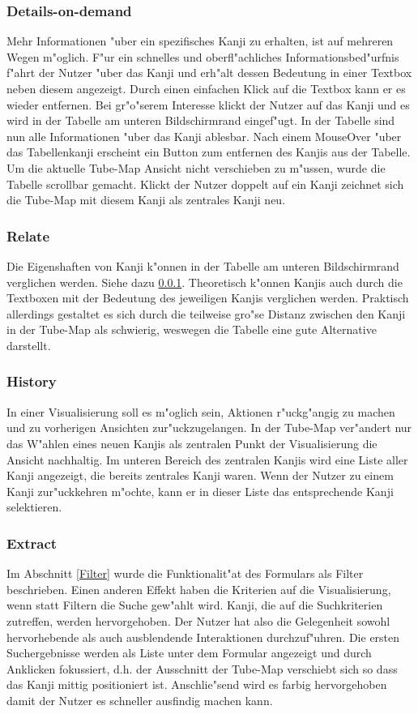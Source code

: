 \subsubsection{Details-on-demand}\label{Details-on-demand}
Mehr Informationen "uber ein spezifisches Kanji zu erhalten, ist auf mehreren Wegen m"oglich. F"ur ein schnelles und oberfl"achliches Informationsbed"urfnis f"ahrt der Nutzer "uber das Kanji und erh"alt dessen Bedeutung in einer Textbox neben diesem angezeigt. Durch einen einfachen Klick auf die Textbox kann er es wieder entfernen. Bei gr"o"serem Interesse klickt der Nutzer auf das Kanji und es wird in der Tabelle am unteren Bildschirmrand eingef"ugt. In der Tabelle sind nun alle Informationen "uber das Kanji ablesbar. Nach einem MouseOver "uber das Tabellenkanji erscheint ein Button zum entfernen des Kanjis aus der Tabelle. Um die aktuelle Tube-Map Ansicht nicht verschieben zu m"ussen, wurde die Tabelle scrollbar gemacht. Klickt der Nutzer doppelt auf ein Kanji zeichnet sich die Tube-Map mit diesem Kanji als zentrales Kanji neu. 

\subsubsection{Relate}
Die Eigenshaften von Kanji k"onnen in der Tabelle am unteren Bildschirmrand verglichen werden. Siehe dazu \ref{Details-on-demand}. Theoretisch k"onnen Kanjis auch durch die Textboxen mit der Bedeutung des jeweiligen Kanjis verglichen werden. Praktisch allerdings gestaltet es sich durch die teilweise gro"se Distanz zwischen den Kanji in der Tube-Map als schwierig, weswegen die Tabelle eine gute Alternative darstellt. 

\subsubsection{History}
In einer Visualisierung soll es m"oglich sein, Aktionen r"uckg"angig zu machen und zu vorherigen Ansichten zur"uckzugelangen. In der Tube-Map ver"andert nur das W"ahlen eines neuen Kanjis als zentralen Punkt der Visualisierung die Ansicht nachhaltig. Im unteren Bereich des zentralen Kanjis wird eine Liste aller Kanji angezeigt, die bereits zentrales Kanji waren. Wenn der Nutzer zu einem Kanji zur"uckkehren m"ochte, kann er in dieser Liste das entsprechende Kanji selektieren.


\subsubsection{Extract}
Im Abschnitt \ref{Filter} wurde die Funktionalit"at des Formulars als Filter beschrieben. Einen anderen Effekt haben die Kriterien auf die Visualisierung, wenn statt Filtern die Suche gew"ahlt wird. Kanji, die auf die Suchkriterien zutreffen, werden hervorgehoben. Der Nutzer hat also die Gelegenheit sowohl hervorhebende als auch ausblendende Interaktionen durchzuf"uhren. Die ersten Suchergebnisse werden als Liste unter dem Formular angezeigt und durch Anklicken fokussiert, d.h. der Ausschnitt der Tube-Map verschiebt sich so dass das Kanji mittig positioniert ist. Anschlie"send  wird es farbig hervorgehoben damit der Nutzer es schneller ausfindig machen kann. 
